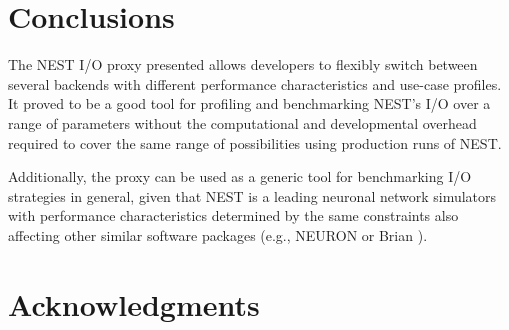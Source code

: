\documentclass[]{YIC2015}
\begin{document}

\section{Conclusions}

The NEST I/O proxy presented allows developers to flexibly switch
between several backends with different performance characteristics
and use-case profiles. It proved to be a good tool for profiling and
benchmarking NEST's I/O over a range of parameters without the
computational and developmental overhead required to cover the same
range of possibilities using production runs of NEST.


Additionally, the proxy can be used as a generic tool for benchmarking
I/O strategies in general, given that NEST is a leading neuronal
network simulators with performance characteristics determined by the
same constraints also affecting other similar software packages (e.g.,
NEURON \cite{neuron} or Brian \cite{brian}).

\section*{Acknowledgments}
\end{document}
